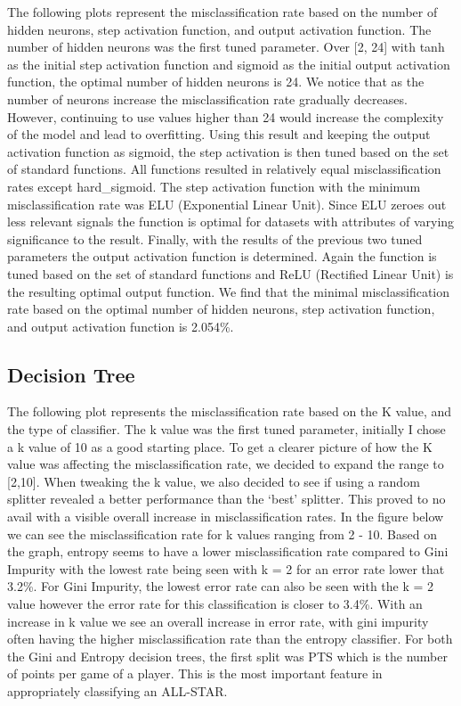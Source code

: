 \documentclass{article}
\begin{document}
The following plots represent the misclassification rate based on the number of hidden neurons, step activation function, and output activation function. The number of hidden neurons was the first tuned parameter. Over [2, 24] with tanh as the initial step activation function and sigmoid as the initial output activation function, the optimal number of hidden neurons is 24. We notice that as the number of neurons increase the misclassification rate gradually decreases. However, continuing to use values higher than 24 would increase the complexity of the model and lead to overfitting. Using this result and keeping the output activation function as sigmoid, the step activation is then tuned based on the set of standard functions. All functions resulted in relatively equal misclassification rates except hard\_sigmoid. The step activation function with the minimum misclassification rate was ELU (Exponential Linear Unit). Since ELU zeroes out less relevant signals the function is optimal for datasets with attributes of varying significance to the result. Finally, with the results of the previous two tuned parameters the output activation function is determined. Again the function is tuned based on the set of standard functions and ReLU (Rectified Linear Unit) is the resulting optimal output function. We find that the minimal misclassification rate based on the optimal number of hidden neurons, step activation function, and output activation function is 2.054\%.


\subsection{Decision Tree}
The following plot represents the misclassification rate based on the K value, and the type of classifier. The k value was the first tuned parameter, initially I chose a k value of 10 as a good starting place. To get a clearer picture of how the K value was affecting the misclassification rate, we decided to expand the range to [2,10]. When tweaking the k value, we also decided to see if using a random splitter revealed a better performance than the ‘best’ splitter. This proved to no avail with a visible overall increase in misclassification rates. In the figure below we can see the misclassification rate for k values ranging from 2 - 10. Based on the graph, entropy seems to have a lower misclassification rate compared to Gini Impurity with the lowest rate being seen with k = 2 for an error rate lower that 3.2\%. For Gini Impurity, the lowest error rate can also be seen with the k = 2 value however the error rate for this classification is closer to 3.4\%. With an increase in k value we see an overall increase in error rate, with gini impurity often having the higher misclassification rate than the entropy classifier. For both the Gini and Entropy decision trees, the first split was PTS which is the number of points per game of a player. This is the most important feature in appropriately classifying an ALL-STAR.
\end{document}
